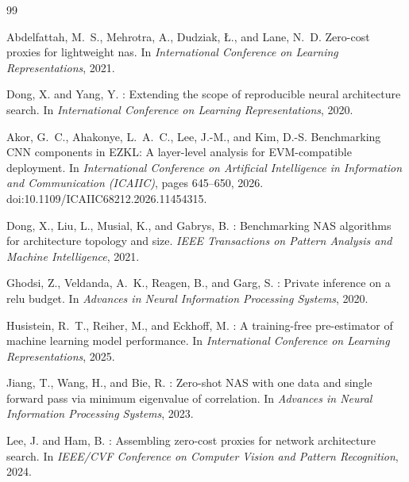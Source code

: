 \documentclass[10pt]{article}
\begin{document}
\begin{thebibliography}{99}

Abdelfattah, M.~S., Mehrotra, A., Dudziak, \L., and Lane, N.~D.
\newblock Zero-cost proxies for lightweight nas.
\newblock In \emph{International Conference on Learning Representations}, 2021.

Dong, X. and Yang, Y.
: Extending the scope of reproducible neural
  architecture search.
\newblock In \emph{International Conference on Learning Representations}, 2020.

Akor, G.~C., Ahakonye, L.~A.~C., Lee, J.-M., and Kim, D.-S.
\newblock Benchmarking {CNN} components in {EZKL}: A layer-level analysis for
  {EVM}-compatible deployment.
\newblock In \emph{International Conference on Artificial Intelligence in
  Information and Communication (ICAIIC)}, pages 645--650, 2026.
  doi:10.1109/ICAIIC68212.2026.11454315.

Dong, X., Liu, L., Musial, K., and Gabrys, B.
: Benchmarking {NAS} algorithms for architecture topology
  and size.
\newblock \emph{IEEE Transactions on Pattern Analysis and Machine Intelligence},
  2021.

Ghodsi, Z., Veldanda, A.~K., Reagen, B., and Garg, S.
: Private inference on a relu budget.
\newblock In \emph{Advances in Neural Information Processing Systems}, 2020.

Husistein, R.~T., Reiher, M., and Eckhoff, M.
: A training-free pre-estimator of machine learning model
  performance.
\newblock In \emph{International Conference on Learning Representations}, 2025.

Jiang, T., Wang, H., and Bie, R.
: Zero-shot {NAS} with one data and single forward pass via
  minimum eigenvalue of correlation.
\newblock In \emph{Advances in Neural Information Processing Systems}, 2023.

Lee, J. and Ham, B.
: Assembling zero-cost proxies for network architecture
  search.
\newblock In \emph{IEEE/CVF Conference on Computer Vision and Pattern
  Recognition}, 2024.


\end{thebibliography}
\end{document}
